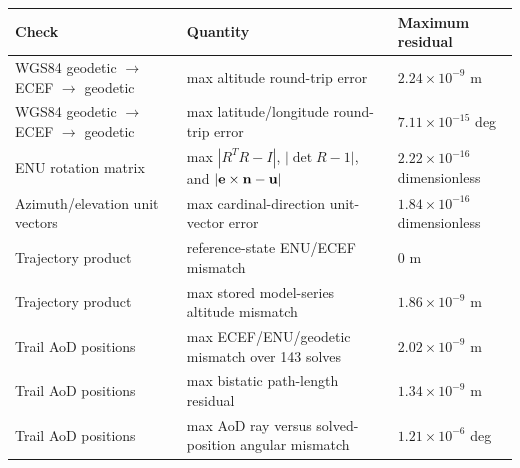 \begin{tabularx}{\linewidth}{lXl}
\toprule
Check & Quantity & Maximum residual \\
\midrule
WGS84 geodetic $\rightarrow$ ECEF $\rightarrow$ geodetic & max altitude round-trip error & $2.24\times 10^{-9}$ m \\
WGS84 geodetic $\rightarrow$ ECEF $\rightarrow$ geodetic & max latitude/longitude round-trip error & $7.11\times 10^{-15}$ deg \\
ENU rotation matrix & max $|R^T R-I|$, $|\det R-1|$, and $|{\bf e}\times{\bf n}-{\bf u}|$ & $2.22\times 10^{-16}$ dimensionless \\
Azimuth/elevation unit vectors & max cardinal-direction unit-vector error & $1.84\times 10^{-16}$ dimensionless \\
Trajectory product & reference-state ENU/ECEF mismatch & $0$ m \\
Trajectory product & max stored model-series altitude mismatch & $1.86\times 10^{-9}$ m \\
Trail AoD positions & max ECEF/ENU/geodetic mismatch over 143 solves & $2.02\times 10^{-9}$ m \\
Trail AoD positions & max bistatic path-length residual & $1.34\times 10^{-9}$ m \\
Trail AoD positions & max AoD ray versus solved-position angular mismatch & $1.21\times 10^{-6}$ deg \\
\bottomrule
\end{tabularx}
